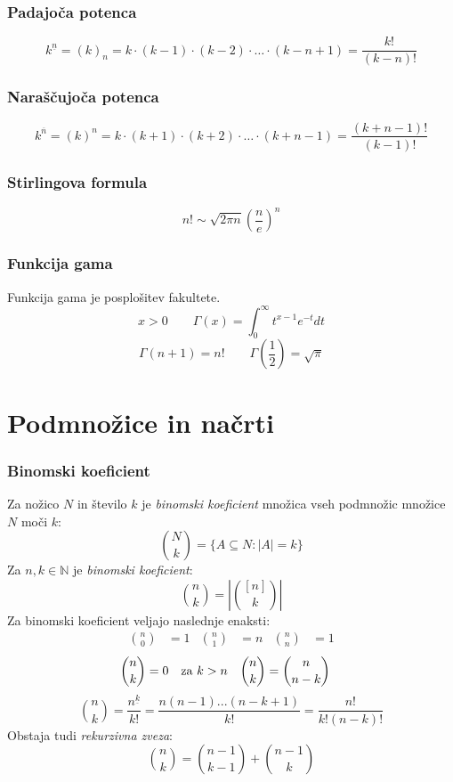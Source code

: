\documentclass[11pt,a4paper]{article}
\begin{document}
\subsubsection*{Padajoča potenca}
\[k^{\underline{n}} = (k)_n = k \cdot (k-1) \cdot (k-2) \cdot \dots \cdot (k - n + 1) = \frac{k!}{(k-n)!}\]

\subsubsection*{Naraščujoča potenca}
\[k^{\overline{n}} = (k)^n = k \cdot (k+1) \cdot (k+2) \cdot \dots \cdot (k + n - 1) = \frac{(k+n-1)!}{(k-1)!}\]

\subsubsection*{Stirlingova formula}
\[n! \sim \sqrt{2 \pi n} (\frac{n}{e})^n\]

\subsubsection*{Funkcija gama}
Funkcija gama je posplošitev fakultete.
\[x>0 \qquad \Gamma(x) = \int_0^{\infty} t^{x-1}e^{-t}dt\]
\[\Gamma(n+1) = n! \qquad \Gamma(\frac{1}{2}) = \sqrt{\pi}\]

\section*{Podmnožice in načrti}
\subsubsection*{Binomski koeficient}
Za nožico $N$ in število $k$ je \emph{binomski koeficient} množica vseh podmnožic množice $N$ moči $k$:
\[ \binom{N}{k} = \{A \subseteq N : |A| = k \} \]
Za $n,k \in \mathbb{N}$ je \emph{binomski koeficient}:
\[ \binom{n}{k} = \left|\binom{[n]}{k}\right|\]
Za binomski koeficient veljajo naslednje enaksti:
\begin{align*}
    \binom{n}{0}&=1 & \binom{n}{1}&=n & \binom{n}{n}&=1
\end{align*}
\begin{align*}
    \binom{n}{k}&=0 \quad \textmd{za $k > n$} & \binom{n}{k}&=\binom{n}{n-k}
\end{align*}
\[\binom{n}{k} = \frac{n^{\underline{k}}}{k!} = \frac{n(n-1)...(n-k+1)}{k!} = \frac{n!}{k!(n-k)!}\]
Obstaja tudi \emph{rekurzivna zveza}:
\[\binom{n}{k} = \binom{n-1}{k-1} + \binom{n-1}{k}\]
\end{document}
